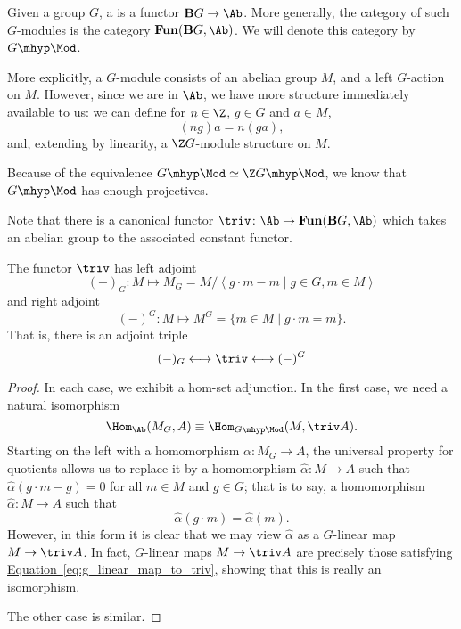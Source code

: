 \documentclass[main.tex]{subfiles}
\begin{document}
Given a group $G$, a  is a functor $\mathbf{B}G \to \Ab$. More generally, the category of such $G$-modules is the category $\mathbf{Fun}(\mathbf{B}G, \Ab)$. We will denote this category by $G\mhyp\Mod$.

More explicitly, a $G$-module consists of an abelian group $M$, and a left $G$-action on $M$. However, since we are in $\Ab$, we have more structure immediately available to us: we can define for $n \in \Z$, $g \in G$ and $a \in M$,
\begin{equation*}
  (ng)a = n(ga),
\end{equation*}
and, extending by linearity, a $\Z G$-module structure on $M$.

Because of the equivalence $G\mhyp\Mod \simeq \Z G\mhyp\Mod$, we know that $G\mhyp\Mod$ has enough projectives.

Note that there is a canonical functor $\triv\colon \Ab \to \mathbf{Fun}(\mathbf{B}G, \Ab)$ which takes an abelian group to the associated constant functor.
\begin{proposition}
  The functor $\triv$ has left adjoint
  \begin{equation*}
    (-)_{G}\colon M \mapsto M_{G} = M/\left\langle g\cdot m - m \mid g \in G, m \in M \right\rangle
  \end{equation*}
  and right adjoint
  \begin{equation*}
    (-)^{G}\colon M \mapsto M^{G} = \{m \in M \mid g\cdot m = m\}.
  \end{equation*}
  That is, there is an adjoint triple
  \begin{equation*}
    (-)_{G} \longleftrightarrow \triv \longleftrightarrow (-)^{G}
  \end{equation*}
\end{proposition}
\begin{proof}
  In each case, we exhibit a hom-set adjunction. In the first case, we need a natural isomorphism
  \begin{equation*}
    \Hom_{\Ab}(M_{G}, A) \equiv \Hom_{G\mhyp\Mod}(M, \triv A).
  \end{equation*}
  Starting on the left with a homomorphism $\alpha\colon M_{G} \to A$, the universal property for quotients allows us to replace it by a homomorphism $\hat{\alpha}\colon M \to A$ such that $\hat{\alpha}(g\cdot m - g) = 0$ for all $m \in M$ and $g \in G$; that is to say, a homomorphism $\hat{\alpha}\colon M \to A$ such that
  \begin{equation}
    \label{eq:g_linear_map_to_triv}
    \hat{\alpha}(g\cdot m) = \hat{\alpha}(m).
  \end{equation}
  However, in this form it is clear that we may view $\hat{\alpha}$ as a $G$-linear map $M \to \triv A$. In fact, $G$-linear maps $M \to \triv A$ are precisely those satisfying \hyperref[eq:g_linear_map_to_triv]{Equation~\ref*{eq:g_linear_map_to_triv}}, showing that this is really an isomorphism.

  The other case is similar.
\end{proof}
\end{document}

